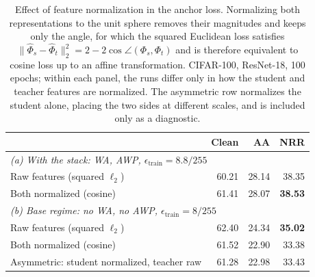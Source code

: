 \begin{table}[!htbp]
  \centering \small \setlength{\tabcolsep}{4.5pt}
  \caption{Effect of feature normalization in the anchor loss. Normalizing both representations to
  the unit sphere removes their magnitudes and keeps only the angle, for which the squared Euclidean
  loss satisfies $\lVert \hat\Phi_s - \hat\Phi_t \rVert_2^2 = 2 - 2\cos\angle(\Phi_s, \Phi_t)$ and is
  therefore equivalent to cosine loss up to an affine transformation. CIFAR-100, ResNet-18, 100
  epochs; within each panel, the runs differ only in how the student and teacher features are
  normalized. The asymmetric row normalizes the student alone, placing the two sides at different
  scales, and is included only as a diagnostic.}
  \label{tab:normalization}
  \begin{tabular}{lrrr}
    \toprule
    & Clean & AA & NRR \\
    \midrule
    \multicolumn{4}{l}{\emph{(a) With the stack: WA, AWP, $\epsilon_{\mathrm{train}} = 8.8/255$}} \\
    Raw features (squared $\ell_2$)            & 60.21 & 28.14 & 38.35 \\
    Both normalized (cosine)                   & 61.41 & 28.07 & \textbf{38.53} \\
    \midrule
    \multicolumn{4}{l}{\emph{(b) Base regime: no WA, no AWP, $\epsilon_{\mathrm{train}} = 8/255$}} \\
    Raw features (squared $\ell_2$)            & 62.40 & 24.34 & \textbf{35.02} \\
    Both normalized (cosine)                   & 61.52 & 22.90 & 33.38 \\
    Asymmetric: student normalized, teacher raw & 61.28 & 22.98 & 33.43 \\
    \bottomrule
  \end{tabular}
\end{table}

